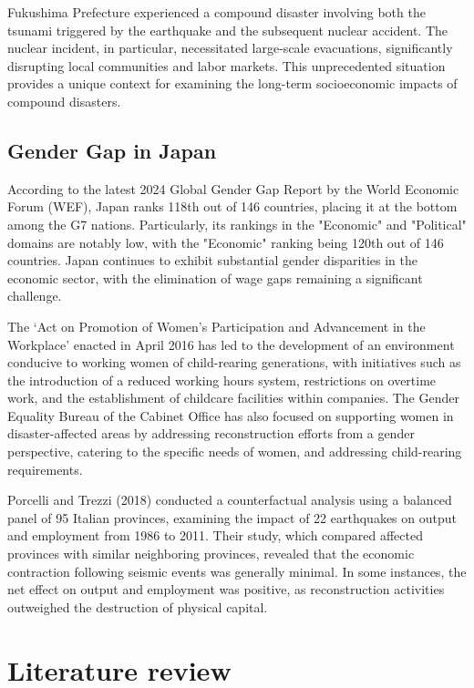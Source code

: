 \documentclass[12pt,halfline,a4paper]{ouparticle}
\begin{document}
Fukushima Prefecture experienced a compound disaster involving both the tsunami triggered by the earthquake and the subsequent nuclear accident. The nuclear incident, in particular, necessitated large-scale evacuations, significantly disrupting local communities and labor markets. This unprecedented situation provides a unique context for examining the long-term socioeconomic impacts of compound disasters.

\subsection{Gender Gap in Japan}
\label{sec5.1}

According to the latest 2024 Global Gender Gap Report by the World Economic Forum (WEF), Japan ranks 118th out of 146 countries, placing it at the bottom among the G7 nations. Particularly, its rankings in the "Economic" and "Political" domains are notably low, with the "Economic" ranking being 120th out of 146 countries. Japan continues to exhibit substantial gender disparities in the economic sector, with the elimination of wage gaps remaining a significant challenge.

The ‘Act on Promotion of Women’s Participation and Advancement in the Workplace’ enacted in April 2016 has led to the development of an environment conducive to working women of child-rearing generations, with initiatives such as the introduction of a reduced working hours system, restrictions on overtime work, and the establishment of childcare facilities within companies. The Gender Equality Bureau of the Cabinet Office has also focused on supporting women in disaster-affected areas by addressing reconstruction efforts from a gender perspective, catering to the specific needs of women, and addressing child-rearing requirements.

 Porcelli and Trezzi (2018)\cite{Porcelli2019TheItaly} conducted a counterfactual analysis using a balanced panel of 95 Italian provinces, examining the impact of 22 earthquakes on output and employment from 1986 to 2011. Their study, which compared affected provinces with similar neighboring provinces, revealed that the economic contraction following seismic events was generally minimal. In some instances, the net effect on output and employment was positive, as reconstruction activities outweighed the destruction of physical capital.


\section{Literature review}
\label{sec3}
\end{document}
